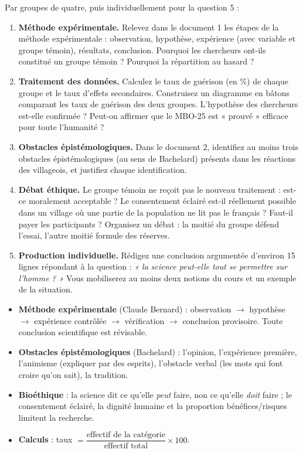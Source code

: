 \documentclass[11pt]{article}
\newcounter{popsec}
\newcounter{popsub}
\newcommand{\courssub}[1]{%
  \stepcounter{popsub}%
  \par\vspace{9pt}\noindent{\popxbold\fontsize{11.5}{13}\selectfont\color{popink}{\color{poporange}\thepopsec.\thepopsub}\hspace{6pt}#1}\par\nopagebreak\vspace{4pt}
}
\begin{document}
Par groupes de quatre, puis individuellement pour la question 5 :

\begin{enumerate}
\item \textbf{Méthode expérimentale.} Relevez dans le document 1 les étapes de la méthode expérimentale : observation, hypothèse, expérience (avec variable et groupe témoin), résultats, conclusion. Pourquoi les chercheurs ont-ils constitué un groupe témoin ? Pourquoi la répartition au hasard ?
\item \textbf{Traitement des données.} Calculez le taux de guérison (en \%) de chaque groupe et le taux d'effets secondaires. Construisez un diagramme en bâtons comparant les taux de guérison des deux groupes. L'hypothèse des chercheurs est-elle confirmée ? Peut-on affirmer que le MBO-25 est « prouvé » efficace pour toute l'humanité ?
\item \textbf{Obstacles épistémologiques.} Dans le document 2, identifiez au moins trois obstacles épistémologiques (au sens de Bachelard) présents dans les réactions des villageois, et justifiez chaque identification.
\item \textbf{Débat éthique.} Le groupe témoin ne reçoit pas le nouveau traitement : est-ce moralement acceptable ? Le consentement éclairé est-il réellement possible dans un village où une partie de la population ne lit pas le français ? Faut-il payer les participants ? Organisez un débat : la moitié du groupe défend l'essai, l'autre moitié formule des réserves.
\item \textbf{Production individuelle.} Rédigez une conclusion argumentée d'environ 15 lignes répondant à la question : \emph{« la science peut-elle tout se permettre sur l'homme ? »} Vous mobiliserez au moins deux notions du cours et un exemple de la situation.
\end{enumerate}

\courssub{Ressources à mobiliser}

\begin{aretenir}
\begin{itemize}
\item \textbf{Méthode expérimentale} (Claude Bernard) : observation $\rightarrow$ hypothèse $\rightarrow$ expérience contrôlée $\rightarrow$ vérification $\rightarrow$ conclusion provisoire. Toute conclusion scientifique est révisable.
\item \textbf{Obstacles épistémologiques} (Bachelard) : l'opinion, l'expérience première, l'animisme (expliquer par des esprits), l'obstacle verbal (les mots qui font croire qu'on sait), la tradition.
\item \textbf{Bioéthique} : la science dit ce qu'elle \emph{peut} faire, non ce qu'elle \emph{doit} faire ; le consentement éclairé, la dignité humaine et la proportion bénéfices/risques limitent la recherche.
\item \textbf{Calculs} : taux $= \dfrac{\text{effectif de la catégorie}}{\text{effectif total}} \times 100$.
\end{itemize}
\end{aretenir}
\end{document}
